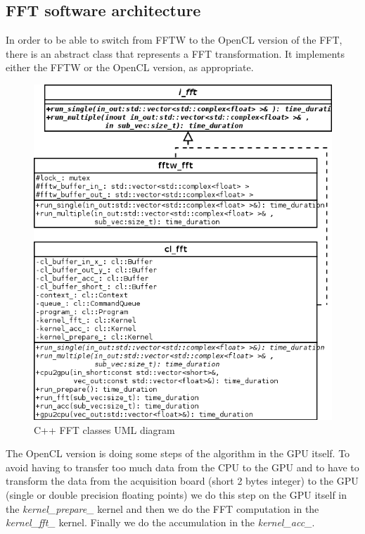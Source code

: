 \subsection{FFT software architecture}

In order to be able to switch from \gls{FFTW} to the \gls{OpenCL} version of the \gls{FFT}, there is an abstract class that represents a \gls{FFT} transformation. It implements either the \gls{FFTW} or the \gls{OpenCL} version, as appropriate.

\begin{figure}[H]
\centering
\caption{C++ FFT classes UML diagram}
\includegraphics[scale=0.5]{fft_uml.png}
\end{figure}

The \gls{OpenCL} version is doing some steps of the algorithm in the \gls{GPU} itself. To avoid having to transfer too much data from the CPU to the GPU and to have to transform the data from the acquisition board (short 2 bytes integer) to the \gls{GPU} (single or double precision floating points) we do this step on the \gls{GPU} itself in the \emph{kernel\_prepare\_} kernel and then we do the \gls{FFT} computation in the \emph{kernel\_fft\_} kernel. Finally we do the accumulation in the \emph{kernel\_acc\_}.

